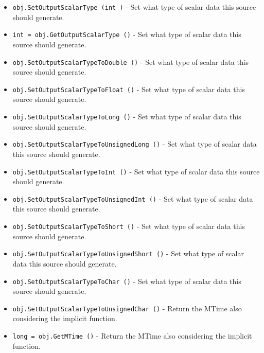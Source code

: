 \begin{itemize}
\item  \verb|obj.SetOutputScalarType (int )| -  Set what type of scalar data this source should generate.

\item  \verb|int = obj.GetOutputScalarType ()| -  Set what type of scalar data this source should generate.

\item  \verb|obj.SetOutputScalarTypeToDouble ()| -  Set what type of scalar data this source should generate.

\item  \verb|obj.SetOutputScalarTypeToFloat ()| -  Set what type of scalar data this source should generate.

\item  \verb|obj.SetOutputScalarTypeToLong ()| -  Set what type of scalar data this source should generate.

\item  \verb|obj.SetOutputScalarTypeToUnsignedLong ()| -  Set what type of scalar data this source should generate.

\item  \verb|obj.SetOutputScalarTypeToInt ()| -  Set what type of scalar data this source should generate.

\item  \verb|obj.SetOutputScalarTypeToUnsignedInt ()| -  Set what type of scalar data this source should generate.

\item  \verb|obj.SetOutputScalarTypeToShort ()| -  Set what type of scalar data this source should generate.

\item  \verb|obj.SetOutputScalarTypeToUnsignedShort ()| -  Set what type of scalar data this source should generate.

\item  \verb|obj.SetOutputScalarTypeToChar ()| -  Set what type of scalar data this source should generate.

\item  \verb|obj.SetOutputScalarTypeToUnsignedChar ()| -  Return the MTime also considering the implicit function.

\item  \verb|long = obj.GetMTime ()| -  Return the MTime also considering the implicit function.

\end{itemize}

